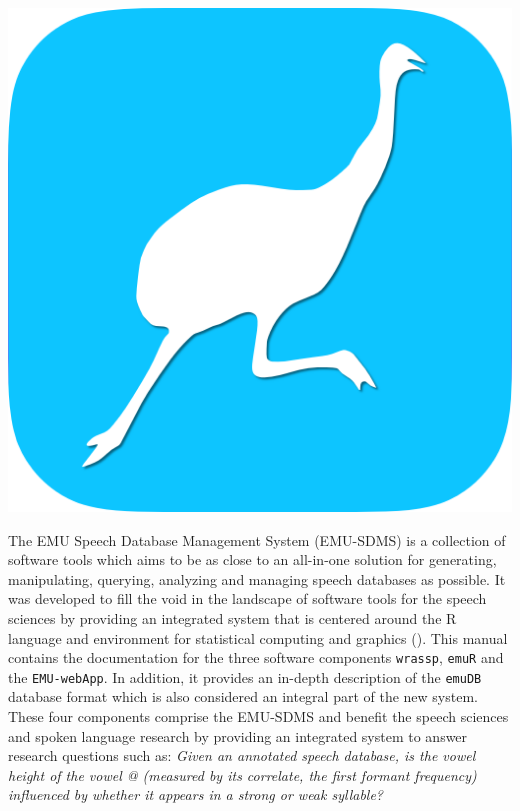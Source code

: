\documentclass[]{book}
\theoremstyle{definition}
\theoremstyle{definition}
\theoremstyle{definition}
\theoremstyle{remark}
\begin{document}
\begin{center}\includegraphics[width=0.35\linewidth]{pics/EMU-webAppIcon-roundCorners} \end{center}

The EMU Speech Database Management System (EMU-SDMS) is a collection of
software tools which aims to be as close to an all-in-one solution for
generating, manipulating, querying, analyzing and managing speech
databases as possible. It was developed to fill the void in the
landscape of software tools for the speech sciences by providing an
integrated system that is centered around the R language and environment
for statistical computing and graphics (\citet{r-core-team:2016a}). This
manual contains the documentation for the three software components
\texttt{wrassp}, \texttt{emuR} and the \texttt{EMU-webApp}. In addition,
it provides an in-depth description of the \texttt{emuDB} database
format which is also considered an integral part of the new system.
These four components comprise the EMU-SDMS and benefit the speech
sciences and spoken language research by providing an integrated system
to answer research questions such as: \emph{Given an annotated speech
database, is the vowel height of the vowel @ (measured by its correlate,
the first formant frequency) influenced by whether it appears in a
strong or weak syllable?}
\end{document}
